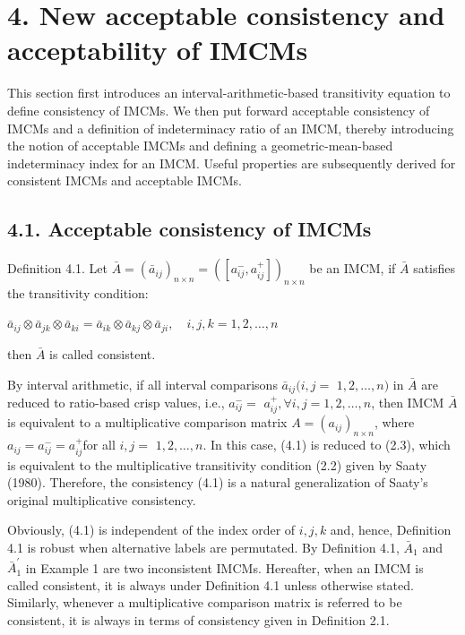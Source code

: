 \documentclass[10pt]{article}
\begin{document}
\section*{4. New acceptable consistency and acceptability of IMCMs}
This section first introduces an interval-arithmetic-based transitivity equation to define consistency of IMCMs. We then put forward acceptable consistency of IMCMs and a definition of indeterminacy ratio of an IMCM, thereby introducing the notion of acceptable IMCMs and defining a geometric-mean-based indeterminacy index for an IMCM. Useful properties are subsequently derived for consistent IMCMs and acceptable IMCMs.

\subsection*{4.1. Acceptable consistency of IMCMs}
Definition 4.1. Let $\bar{A}=\left(\bar{a}_{i j}\right)_{n \times n}=\left(\left[a_{i j}^{-}, a_{i j}^{+}\right]\right)_{n \times n}$ be an IMCM, if $\bar{A}$ satisfies the transitivity condition:

$\bar{a}_{i j} \otimes \bar{a}_{j k} \otimes \bar{a}_{k i}=\bar{a}_{i k} \otimes \bar{a}_{k j} \otimes \bar{a}_{j i}, \quad i, j, k=1,2, \ldots, n$

then $\bar{A}$ is called consistent.

By interval arithmetic, if all interval comparisons $\bar{a}_{i j}(i, j=$ $1,2, \ldots, n)$ in $\bar{A}$ are reduced to ratio-based crisp values, i.e., $a_{i j}^{-}=$ $a_{i j}^{+}, \forall i, j=1,2, \ldots, n$, then IMCM $\bar{A}$ is equivalent to a multiplicative comparison matrix $A=\left(a_{i j}\right)_{n \times n}$, where $a_{i j}=a_{i j}^{-}=a_{i j}^{+}$for all $i, j=$ $1,2, \ldots, n$. In this case, (4.1) is reduced to (2.3), which is equivalent to the multiplicative transitivity condition (2.2) given by Saaty (1980). Therefore, the consistency (4.1) is a natural generalization of Saaty's original multiplicative consistency.

Obviously, (4.1) is independent of the index order of $i, j, k$ and, hence, Definition 4.1 is robust when alternative labels are permutated. By Definition 4.1, $\bar{A}_{1}$ and $\bar{A}_{1}^{\prime}$ in Example 1 are two inconsistent IMCMs. Hereafter, when an IMCM is called consistent, it is always under Definition 4.1 unless otherwise stated. Similarly, whenever a multiplicative comparison matrix is referred to be consistent, it is always in terms of consistency given in Definition 2.1.
\end{document}
